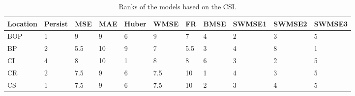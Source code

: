 \documentclass[11pt, a4paper]{article}
\begin{document}
\begin{table}[H]
\centering
\fontsize{5}{6}\selectfont
\caption{Ranks of the models based on the CSI.}\label{tb:rankcsi}
\begin{tabular}{lllllllllll}
\multicolumn{1}{c}{\textbf{Location}} & \multicolumn{1}{c}{\textbf{Persist}} & \multicolumn{1}{c}{\textbf{MSE}} & \multicolumn{1}{c}{\textbf{MAE}} & \multicolumn{1}{c}{\textbf{Huber}} & \multicolumn{1}{c}{\textbf{WMSE}} & \multicolumn{1}{c}{\textbf{FR}} & \multicolumn{1}{c}{\textbf{BMSE}} & \multicolumn{1}{c}{\textbf{SWMSE1}} & \multicolumn{1}{c}{\textbf{SWMSE2}} & \multicolumn{1}{c}{\textbf{SWMSE3}} \\ \hline
BOP                         & 1                                        & 9                                & 9                                & 6                                  & 9                                 & 7                               & 4                                 & 2                                   & 3                                   & 5                                   \\
BP                        & 2                                        & 5.5                              & 10                               & 9                                  & 7                                 & 5.5                             & 3                                 & 4                                   & 8                                   & 1                                   \\
CI                        & 4                                        & 8                                & 10                               & 1                                  & 8                                 & 8                               & 6                                 & 3                                   & 2                                   & 5                                   \\
CR                           & 2                                        & 7.5                              & 9                                & 6                                  & 7.5                               & 10                              & 1                                 & 4                                   & 3                                   & 5                                   \\
CS                           & 1                                        & 7.5                              & 9                                & 6                                  & 7.5                               & 10                              & 2                                 & 3                                   & 4                                   & 5                                   \\

\end{tabular}
\end{table}
\end{document}
